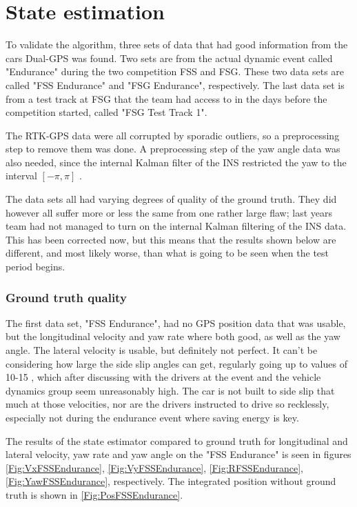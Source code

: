 \section{State estimation}

To validate the algorithm, three sets of data that had good information from the cars Dual-\gls{GPS} was found. Two sets are from the actual dynamic event called "Endurance" during the two competition \gls{FSS} and \gls{FSG}. These two data sets are called "FSS Endurance" and "FSG Endurance", respectively. The last data set is from a test track at \gls{FSG} that the team had access to in the days before the competition started, called "FSG Test Track 1". 

The RTK-GPS data were all corrupted by sporadic outliers, so a preprocessing step to remove them was done. A preprocessing step of the yaw angle data was also needed, since the internal Kalman filter of the \gls{INS} restricted the yaw to the interval $[-\pi,\pi]$ \radians. 

The data sets all had varying degrees of quality of the ground truth. They did however all suffer more or less the same from one rather large flaw; last years team had not managed to turn on the internal Kalman filtering of the \gls{INS} data. This has been corrected now, but this means that the results shown below are different, and most likely worse, than what is going to be seen when the test period begins.

\subsubsection{Ground truth quality}

The first data set, "FSS Endurance", had no \gls{GPS} position data that was usable, but the longitudinal velocity and yaw rate where both good, as well as the yaw angle. The lateral velocity is usable, but definitely not perfect. It can't be considering how large the side slip angles can get, regularly going up to values of 10-15 \degrees, which after discussing with the drivers at the event and the vehicle dynamics group seem unreasonably high. The car is not built to side slip that much at those velocities, nor are the drivers instructed to drive so recklessly, especially not during the endurance event where saving energy is key. 

The results of the state estimator compared to ground truth for longitudinal  and lateral velocity, yaw rate and yaw angle on the "FSS Endurance" is seen in figures \ref{Fig:VxFSSEndurance}, \ref{Fig:VyFSSEndurance}, \ref{Fig:RFSSEndurance}, \ref{Fig:YawFSSEndurance}, respectively. The integrated position without ground truth is shown in \ref{Fig:PosFSSEndurance}. 

